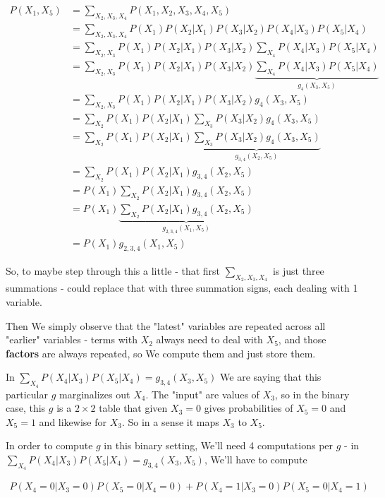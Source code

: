 \documentclass{article}
\begin{document}
		\begin{align}
			P(X_1, X_5) &= \sum_{X_2, X_3, X_4} P(X_1, X_2, X_3, X_4, X_5)\\
			&= \sum_{X_2, X_3, X_4} P(X_1)P(X_2|X_1)P(X_3|X_2)P(X_4|X_3)P(X_5|X_4)\\
			&= \sum_{X_2, X_3} P(X_1)P(X_2|X_1)P(X_3|X_2)\sum_{X_4}P(X_4|X_3)P(X_5|X_4)\\
			&= \sum_{X_2, X_3} P(X_1)P(X_2|X_1)P(X_3|X_2)\underbrace{\sum_{X_4}P(X_4|X_3)P(X_5|X_4)}_{g_4(X_3, X_5)}\\
			&= \sum_{X_2, X_3} P(X_1)P(X_2|X_1)P(X_3|X_2)g_4(X_3, X_5)\\
			&= \sum_{X_2} P(X_1)P(X_2|X_1)\sum_{X_3}P(X_3|X_2)g_4(X_3, X_5)\\
			&= \sum_{X_2} P(X_1)P(X_2|X_1)\underbrace{\sum_{X_3}P(X_3|X_2)g_4(X_3, X_5)}_{g_{3, 4}(X_2, X_5)}\\
			&= \sum_{X_2} P(X_1)P(X_2|X_1)g_{3, 4}(X_2, X_5)\\
			&= P(X_1)\sum_{X_2} P(X_2|X_1)g_{3, 4}(X_2, X_5)\\
			&= P(X_1)\underbrace{\sum_{X_2} P(X_2|X_1)g_{3, 4}(X_2, X_5)}_{g_{2, 3, 4}(X_1, X_5)}\\
			&= P(X_1)g_{2, 3, 4}(X_1, X_5)
		\end{align}
		
		So, to maybe step through this a little - that first $\sum_{X_2, X_3, X_4}$ is just three summations - could replace that with three summation signs, each dealing with 1 variable.
		
		Then We simply observe that the "latest" variables are repeated across all "earlier" variables - terms with $X_2$ always need to deal with $X_5$, and those \textbf{factors} are always repeated, so We compute them and just store them.
		
		In $\sum_{X_4}P(X_4|X_3)P(X_5|X_4) = g_{3, 4}(X_3, X_5)$ We are saying that this particular $g$ marginalizes out $X_4$. The "input" are values of $X_3$, so in the binary case, this $g$ is a $2\times 2$ table that given $X_3=0$ gives probabilities of $X_5=0$ and $X_5=1$ and likewise for $X_3$. So in a sense it maps $X_3$ to $X_5$. 
		
		In order to compute $g$ in this binary setting, We'll need 4 computations per $g$ - in $\sum_{X_4}P(X_4|X_3)P(X_5|X_4) = g_{3, 4}(X_3, X_5)$, We'll have to compute 
		
		\begin{align}
			P(X_4=0|X_3=0)P(X_5=0|X_4=0) + P(X_4=1|X_3=0)P(X_5=0|X_4=1)
		\end{align}
		
\end{document}

